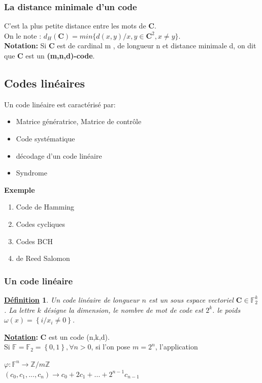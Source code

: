 \documentclass[12pt,openany]{report}
\newtheorem{definition}{\underline{Définition}}
\begin{document}
\subsubsection{La distance minimale d'un code}
C'est la plus petite distance entre les mots de $\mathbf{C}$. \\On le note : 
$d_H \left( \mathbf{C} \right)=min\lbrace d(x,y)/ x,y \in \mathbf{C}^2 , x \neq y \rbrace $.\\

\textbf{Notation:}
Si \textbf{C} est de cardinal m , de longueur n et distance minimale d, on dit que \textbf{C} est un \textbf{(m,n,d)-code}.\\
\subsection{Codes linéaires}
Un code linéaire est caractérisé par:
\begin{itemize}
\item Matrice génératrice, Matrice de contrôle
\item Code systématique
\item décodage d'un code linéaire
\item Syndrome
\end{itemize}
\textbf{Exemple}
\begin{enumerate}
\item Code de Hamming
\item Codes cycliques
\item Codes BCH
\item de Reed Salomon
\end{enumerate}
\subsubsection{ Un code linéaire}
\begin{definition}Un code linéaire de longueur $n$ est un sous espace vectoriel $ \mathbf{C} \in \mathbb{F}_2^k $. La lettre $k$ désigne la dimension, le nombre de mot de code est $2^k$. le poids $ \omega\left( x\right) = \left\lbrace i / x_i \neq 0\right\rbrace $.
\end{definition}
\textbf{\underline{Notation}: } \textbf{C} est un code (n,k,d).\\
Si $\mathbb{F}=\mathbb{F}_2=\left\lbrace 0,1\right\rbrace , \forall n > 0 $, si l'on pose $ m=2^n $, l'application \\
\begin{center}


 $\varphi: \mathbb{F}^n \rightarrow \mathbb{Z}/m\mathbb{Z}$\\ 
 $(c_0,c_1,...,c_n) \rightarrow c_0+2c_1+...+2^{n-1}c_{n-1}$
 \end{center}
\end{document}
